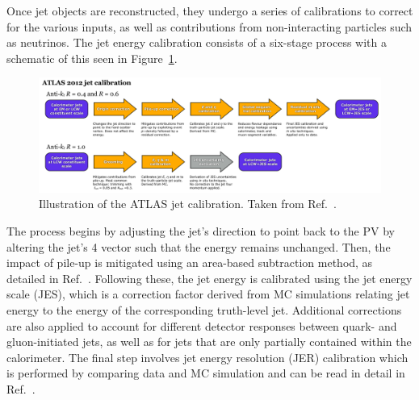 Once jet objects are reconstructed, they undergo a series of calibrations to correct for the various inputs, as well as contributions from non-interacting particles such as neutrinos. The jet energy calibration consists of a six-stage process with a schematic of this seen in Figure~\ref{fig:reco_jets_calibration_stream}.

\begin{figure}[htp]
  \centering
  \includegraphics[width=1\textwidth]{figures/reco/reco_jet_calibration_stream.png}
  \caption{Illustration of the ATLAS jet calibration. Taken from Ref.~\cite{ATLAS:2019oxp}.}\label{fig:reco_jets_calibration_stream}
\end{figure}

The process begins by adjusting the jet's direction to point back to the PV by altering the jet's 4 vector such that the energy remains unchanged. Then, the impact of pile-up is mitigated using an area-based subtraction method, as detailed in Ref.~\cite{ATLAS:2013eua}. Following these, the jet energy is calibrated using the jet energy scale (JES), which is a correction factor derived from MC simulations relating jet energy to the energy of the corresponding truth-level jet. Additional corrections are also applied to account for different detector responses between quark- and gluon-initiated jets, as well as for jets that are only partially contained within the calorimeter. The final step involves jet energy resolution (JER) calibration which is performed by comparing data and MC simulation and can be read in detail in Ref.~\cite{ATLAS:2019oxp}. 